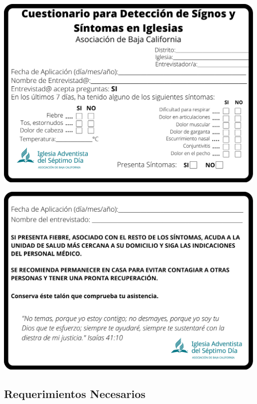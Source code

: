 \documentclass[]{article}
\begin{document}
\includegraphics[width=5.20833in]{data/img/1.png}

\includegraphics[width=5.20833in]{data/img/2.png}

\subsection{Requerimientos Necesarios}\label{requerimientos-necesarios}
\end{document}

